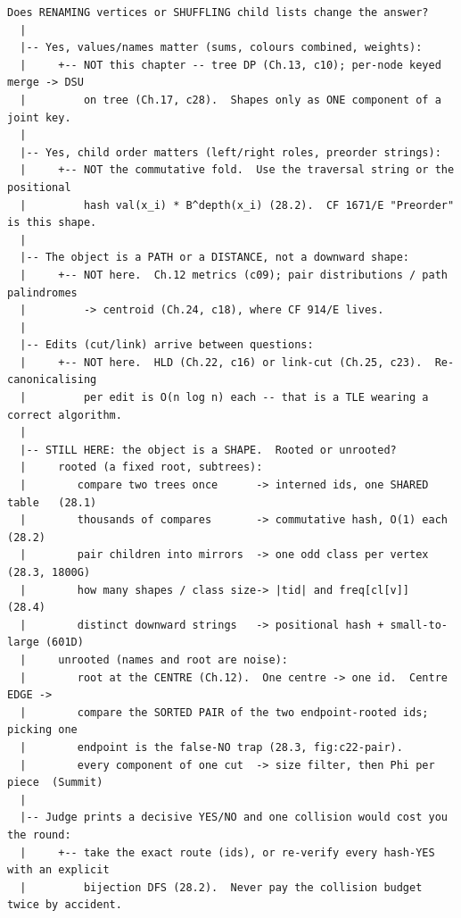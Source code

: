 \begin{lstlisting}[language={}, basicstyle=\ttfamily\small, numbers=none, frame=single]
  Does RENAMING vertices or SHUFFLING child lists change the answer?
  |
  |-- Yes, values/names matter (sums, colours combined, weights):
  |     +-- NOT this chapter -- tree DP (Ch.13, c10); per-node keyed merge -> DSU
  |         on tree (Ch.17, c28).  Shapes only as ONE component of a joint key.
  |
  |-- Yes, child order matters (left/right roles, preorder strings):
  |     +-- NOT the commutative fold.  Use the traversal string or the positional
  |         hash val(x_i) * B^depth(x_i) (28.2).  CF 1671/E "Preorder" is this shape.
  |
  |-- The object is a PATH or a DISTANCE, not a downward shape:
  |     +-- NOT here.  Ch.12 metrics (c09); pair distributions / path palindromes
  |         -> centroid (Ch.24, c18), where CF 914/E lives.
  |
  |-- Edits (cut/link) arrive between questions:
  |     +-- NOT here.  HLD (Ch.22, c16) or link-cut (Ch.25, c23).  Re-canonicalising
  |         per edit is O(n log n) each -- that is a TLE wearing a correct algorithm.
  |
  |-- STILL HERE: the object is a SHAPE.  Rooted or unrooted?
  |     rooted (a fixed root, subtrees):
  |        compare two trees once      -> interned ids, one SHARED table   (28.1)
  |        thousands of compares       -> commutative hash, O(1) each      (28.2)
  |        pair children into mirrors  -> one odd class per vertex         (28.3, 1800G)
  |        how many shapes / class size-> |tid| and freq[cl[v]]            (28.4)
  |        distinct downward strings   -> positional hash + small-to-large (601D)
  |     unrooted (names and root are noise):
  |        root at the CENTRE (Ch.12).  One centre -> one id.  Centre EDGE ->
  |        compare the SORTED PAIR of the two endpoint-rooted ids; picking one
  |        endpoint is the false-NO trap (28.3, fig:c22-pair).
  |        every component of one cut  -> size filter, then Phi per piece  (Summit)
  |
  |-- Judge prints a decisive YES/NO and one collision would cost you the round:
  |     +-- take the exact route (ids), or re-verify every hash-YES with an explicit
  |         bijection DFS (28.2).  Never pay the collision budget twice by accident.
\end{lstlisting}


